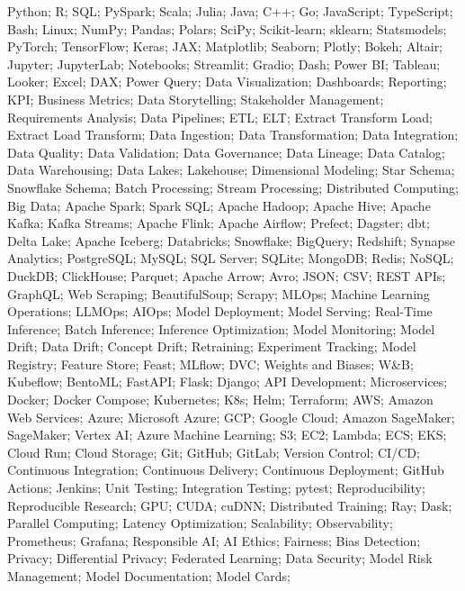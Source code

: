 {  %
  Python; R; SQL; PySpark; Scala; Julia; Java; C++; Go;
  JavaScript; TypeScript; Bash; Linux; NumPy; Pandas; Polars;
  SciPy; Scikit-learn; sklearn; Statsmodels; PyTorch; TensorFlow;
  Keras; JAX; Matplotlib; Seaborn; Plotly; Bokeh; Altair;
  Jupyter; JupyterLab; Notebooks; Streamlit; Gradio; Dash;
  Power BI; Tableau; Looker; Excel; DAX; Power Query;
  Data Visualization; Dashboards; Reporting; KPI; Business Metrics;
  Data Storytelling; Stakeholder Management; Requirements Analysis;
  Data Pipelines; ETL; ELT; Extract Transform Load; Extract Load Transform;
  Data Ingestion; Data Transformation; Data Integration; Data Quality;
  Data Validation; Data Governance; Data Lineage; Data Catalog;
  Data Warehousing; Data Lakes; Lakehouse; Dimensional Modeling;
  Star Schema; Snowflake Schema; Batch Processing; Stream Processing;
  Distributed Computing; Big Data; Apache Spark; Spark SQL;
  Apache Hadoop; Apache Hive; Apache Kafka; Kafka Streams; Apache Flink;
  Apache Airflow; Prefect; Dagster; dbt; Delta Lake; Apache Iceberg;
  Databricks; Snowflake; BigQuery; Redshift; Synapse Analytics;
  PostgreSQL; MySQL; SQL Server; SQLite; MongoDB; Redis;
  NoSQL; DuckDB; ClickHouse; Parquet; Apache Arrow; Avro;
  JSON; CSV; REST APIs; GraphQL; Web Scraping; BeautifulSoup; Scrapy;
  MLOps; Machine Learning Operations; LLMOps; AIOps; Model Deployment;
  Model Serving; Real-Time Inference; Batch Inference; Inference Optimization;
  Model Monitoring; Model Drift; Data Drift; Concept Drift; Retraining;
  Experiment Tracking; Model Registry; Feature Store; Feast;
  MLflow; DVC; Weights and Biases; W\&B; Kubeflow; BentoML;
  FastAPI; Flask; Django; API Development; Microservices;
  Docker; Docker Compose; Kubernetes; K8s; Helm; Terraform;
  AWS; Amazon Web Services; Azure; Microsoft Azure; GCP; Google Cloud;
  Amazon SageMaker; SageMaker; Vertex AI; Azure Machine Learning;
  S3; EC2; Lambda; ECS; EKS; Cloud Run; Cloud Storage;
  Git; GitHub; GitLab; Version Control; CI/CD;
  Continuous Integration; Continuous Delivery; Continuous Deployment;
  GitHub Actions; Jenkins; Unit Testing; Integration Testing; pytest;
  Reproducibility; Reproducible Research; GPU; CUDA; cuDNN;
  Distributed Training; Ray; Dask; Parallel Computing;
  Latency Optimization; Scalability; Observability; Prometheus; Grafana;
  Responsible AI; AI Ethics; Fairness; Bias Detection; Privacy;
  Differential Privacy; Federated Learning; Data Security;
  Model Risk Management; Model Documentation; Model Cards;
}
